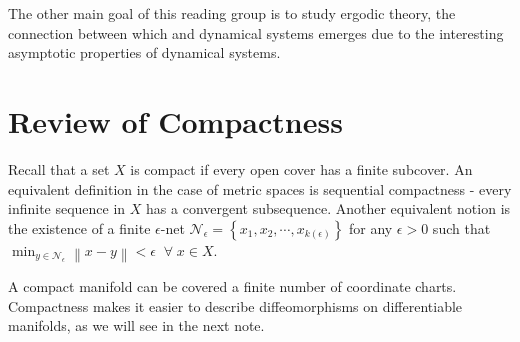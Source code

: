 \documentclass[11pt]{article}
\newcommand{\norm}[1]{\left\lVert#1\right\rVert}
\begin{document}
The other main goal of this reading group is to study ergodic theory, the connection between 
which and dynamical systems emerges due to the interesting asymptotic
properties of dynamical systems. 


\section*{Review of Compactness}

Recall that a set $X$ is compact if every open cover has a finite subcover. An equivalent
definition in the case of metric spaces is sequential compactness - every 
infinite sequence in $X$ has a convergent subsequence. Another equivalent
notion is the existence of a finite $\epsilon$-net  $\mathcal{N}_\epsilon = \left\{ x_1, x_2, \cdots, x_{k(\epsilon)} \right\}$   for any $\epsilon > 0$ such that $\min_{y \in \mathcal{N}_\epsilon} \norm{x-y} < \epsilon\;\;\forall\;x \in X$.  

A compact manifold can be covered a finite number of coordinate charts. Compactness makes it easier to describe diffeomorphisms on 
differentiable manifolds, as we will see in the next note.



\end{document}
